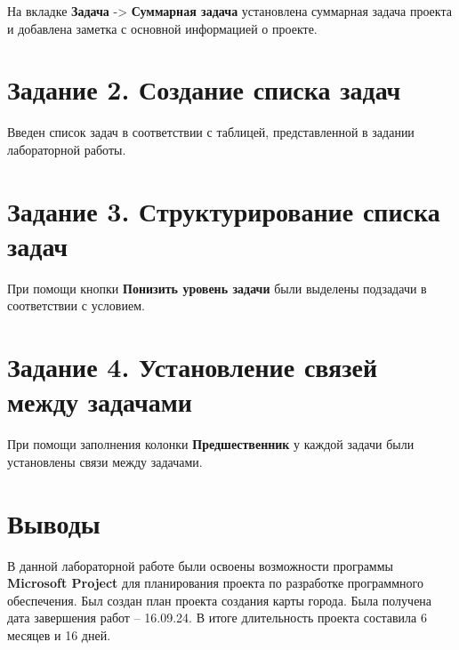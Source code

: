 На вкладке \textbf{Задача} -> \textbf{Суммарная задача} установлена суммарная задача проекта и добавлена заметка с основной информацией о проекте.

\section*{Задание 2. Создание списка задач}
Введен список задач в соответствии с таблицей, представленной в задании лабораторной работы.

\section*{Задание 3. Структурирование списка задач}
При помощи кнопки \textbf{Понизить уровень задачи} были выделены подзадачи в соответствии с условием.

\section*{Задание 4. Установление связей между задачами}
При помощи заполнения колонки \textbf{Предшественник} у каждой задачи были установлены связи между задачами.\

\section*{Выводы}
В данной лабораторной работе были освоены возможности программы \textbf{Microsoft Project} для планирования проекта по разработке программного обеспечения. Был создан план проекта создания карты города. Была получена дата завершения работ – 16.09.24. В итоге длительность проекта составила 6 месяцев и 16 дней.
